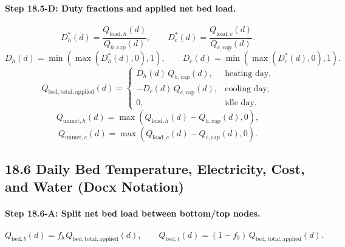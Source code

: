 \documentclass[11pt]{article}
\begin{document}
\paragraph{Step 18.5-D: Duty fractions and applied net bed load.}
\begin{equation}
D_h^*(d)=\frac{Q_{\mathrm{load},h}(d)}{Q_{h,\mathrm{cap}}(d)},\qquad
D_c^*(d)=\frac{Q_{\mathrm{load},c}(d)}{Q_{c,\mathrm{cap}}(d)}.
\tag{18.5D-1}
\end{equation}
\begin{equation}
D_h(d)=\min(\max(D_h^*(d),0),1),\qquad
D_c(d)=\min(\max(D_c^*(d),0),1).
\tag{18.5D-2}
\end{equation}
\begin{equation}
Q_{\mathrm{bed,total,applied}}(d)=
\begin{cases}
D_h(d)\,Q_{h,\mathrm{cap}}(d), & \text{heating day},\\[4pt]
-D_c(d)\,Q_{c,\mathrm{cap}}(d), & \text{cooling day},\\[4pt]
0, & \text{idle day}.
\end{cases}
\tag{18.5D-3}
\end{equation}
\begin{equation}
Q_{\mathrm{unmet},h}(d)=\max\!\left(Q_{\mathrm{load},h}(d)-Q_{h,\mathrm{cap}}(d),0\right),
\tag{18.5D-4}
\end{equation}
\begin{equation}
Q_{\mathrm{unmet},c}(d)=\max\!\left(Q_{\mathrm{load},c}(d)-Q_{c,\mathrm{cap}}(d),0\right).
\tag{18.5D-5}
\end{equation}

\subsection*{18.6 Daily Bed Temperature, Electricity, Cost, and Water (Docx Notation)}
\paragraph{Step 18.6-A: Split net bed load between bottom/top nodes.}
\begin{equation}
Q_{\mathrm{bed},b}(d)=f_b\,Q_{\mathrm{bed,total,applied}}(d),\qquad
Q_{\mathrm{bed},t}(d)=(1-f_b)\,Q_{\mathrm{bed,total,applied}}(d).
\tag{18.6A-1}
\end{equation}
\end{document}
